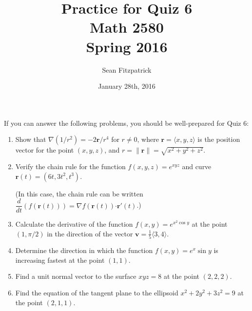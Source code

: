\documentclass[letterpaper,12pt]{article}
\title{Practice for Quiz 6\\Math 2580\\Spring 2016}
\author{Sean Fitzpatrick}
\date{January 28th, 2016}
\begin{document}
 \maketitle

If you can answer the following problems, you should be well-prepared for Quiz 6:



\begin{enumerate}
 \item Show that $\nabla(1/r^2) = -2\mathbf{r}/r^4$ for $r\neq 0$, where $\mathbf{r}=\langle x,y,z\rangle$ is the position vector for the point $(x,y,z)$, and $r=\lVert \mathbf{r}\rVert = \sqrt{x^2+y^2+z^2}$.
 \item Verify the chain rule for the function $f(x,y,z) = e^{xyz}$ and curve $\mathbf{r}(t)=(6t,3t^2,t^3)$.
 
 (In this case, the chain rule can be written $\dfrac{d}{dt}(f(\mathbf{r}(t))) = \nabla f(\mathbf{r}(t))\boldsymbol{\cdot}\mathbf{r}'(t)$.)
 
 \item Calculate the derivative of the function $f(x,y)=e^{x^2\cos y}$ at the point $(1,\pi/2)$ in the direction of the vector $\mathbf{v} = \frac{1}{5}\langle 3,4\rangle$.
 
 \item Determine the direction in which the function $f(x,y)=e^x\sin y$ is increasing fastest at the point $(1,1)$.
 \item Find a unit normal vector to the surface $xyz=8$ at the point $(2,2,2)$.
 \item Find the equation of the tangent plane to the ellipsoid $x^2+2y^2+3z^2=9$ at the point $(2,1,1)$.
\end{enumerate}
\end{document}
